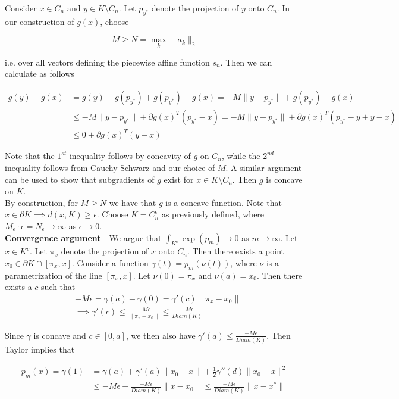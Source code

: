 \documentclass[11pt,reqno]{amsart}
\theoremstyle{definition}
\numberwithin{equation}{section}
\newcommand{\eps}{\epsilon}
\newcommand{\tb}{\textbf}
\newcommand{\pa}{\partial}
\begin{document}
Consider $x \in C_n$ and $y \in K \setminus C_n$. Let $p_{y^*}$ denote the projection of $y$ onto $C_n$. In our construction of $g(x)$, choose 

\[
M \geq N = \max_{k} \|a_k\|_2 
\]

i.e. over all vectors defining the piecewise affine function $s_n$. Then we can calculate as follows 

\begin{align*}
g(y) - g(x) &= g(y) - g(p_{y^*}) + g(p_{y^*}) - g(x) = -M \|y - p_{y^*}\| + g(p_{y^*}) - g(x) \\
&\leq -M \|y - p_{y^*}\| + \pa g(x)^T(p_{y^*} - x) = -M \|y - p_{y^*}\| + \pa g(x)^T(p_{y^*} - y +y - x) \\
&\leq 0 + \pa g(x)^T(y - x) 
\end{align*}

Note that the $1^{st}$ inequality follows by concavity of $g$ on $C_n$, while the $2^{nd}$ inequality follows from Cauchy-Schwarz and our choice of $M$. A similar argument can be used to show that subgradients of $g$ exist for $x \in K \setminus C_n$. Then $g$ is concave on $K$. \\

By construction, for $M \geq N$ we have that $g$ is a concave function. Note that $x \in \pa K \implies d(x,K) \geq \eps$. Choose $K = C_n^{\eps}$ as previously defined, where $M_{\eps} \cdot \eps = N_{\eps} \to \infty$ as $\eps \to 0$.\\

\tb{Convergence argument} - We argue that $\int_{K^c} \exp(p_m) \to 0$ as $m \to \infty$. Let $x \in K^c$. Let $\pi_x$ denote the projection of $x$ onto $C_n$. Then there exists a point $x_0 \in \pa K \cap [\pi_x, x]$. Consider a function $\gamma(t) = p_m(\nu(t))$, where $\nu$ is a parametrization of the line $[\pi_x, x]$. Let $\nu(0) = \pi_x$ and $\nu(a) = x_0$. Then there exists a $c$ such that \\

\begin{align*}
&-M \eps = \gamma(a) - \gamma(0) = \gamma'(c) \|\pi_x - x_0\|\\
&\implies \gamma'(c) \leq \frac{-M \eps}{\|\pi_x - x_0\|} \leq \frac{-M \eps}{Diam(K)} 
\end{align*}

Since $\gamma$ is concave and $c \in [0,a]$, we then also have $\gamma'(a) \leq \frac{-M \eps}{Diam(K)}$. Then Taylor implies that 

\begin{align*}
p_m(x) = \gamma(1) &= \gamma(a) + \gamma'(a) \|x_0 - x\| + \frac{1}{2} \gamma''(d) \|x_0 - x\|^2\\
&\leq -M \eps + \frac{-M \eps}{Diam(K)} \|x - x_0\| \leq \frac{-M \eps}{Diam(K)} \|x - x^*\|
\end{align*} 
\end{document}
